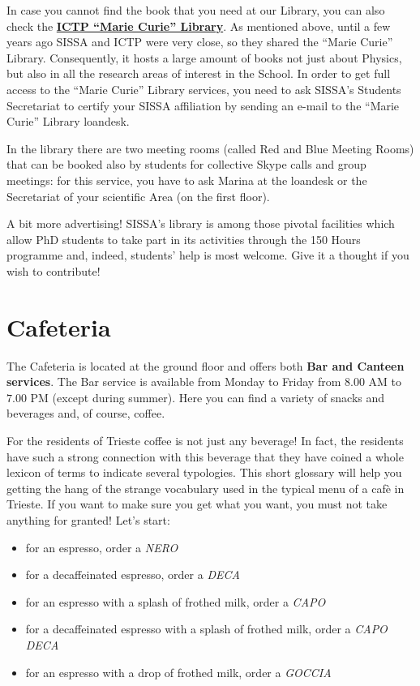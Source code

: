 \documentclass{sissavademecum}
\begin{document}
In case you cannot find the book that you need at our Library, you can also check the \href{http://library.ictp.it/}{\textbf{ICTP ``Marie Curie'' Library}}. As mentioned above, until a few years ago SISSA and ICTP were very close, so they shared the ``Marie Curie'' Library. Consequently, it hosts a large amount of books not just about Physics, but also in all the research areas of interest in the School. In order to get full access to the ``Marie Curie'' Library services, you need to ask SISSA's Students Secretariat to certify your SISSA affiliation by sending an e-mail to the ``Marie Curie'' Library loandesk.

In the library there are two meeting rooms (called Red and Blue Meeting Rooms) that can be booked also by students for collective Skype calls and group meetings: for this service, you have to ask Marina at the loandesk or the Secretariat of your scientific Area (on the first floor).

A bit more advertising! SISSA's library is among those pivotal facilities which allow PhD students to take part in its activities through the 150 Hours programme and, indeed, students' help is most welcome. Give it a thought if you wish to contribute!


\section{Cafeteria}

The Cafeteria is located at the ground floor and offers both \textbf{Bar and Canteen services}. The Bar service is available from Monday to Friday from $8.00$ AM to $7.00$ PM (except during summer). Here you can find a variety of snacks and beverages and, of course, coffee. 

For the residents of Trieste coffee is not just any beverage! In fact, the residents have such a strong connection with this beverage that they have coined a whole lexicon of terms to indicate several typologies. This short glossary will help you getting the hang of the strange vocabulary used in the typical menu of a caf\`e in Trieste. If you want to make sure you get what you want, you must not take anything for granted! Let's start:

\begin{itemize}
    \item for an espresso, order a \textit{NERO}
    \item for a decaffeinated espresso, order a \textit{DECA}
    \item for an espresso with a splash of frothed milk, order a \textit{CAPO}
    \item for a decaffeinated espresso with a splash of frothed milk, order a \textit{CAPO DECA}
    \item for an espresso with a drop of frothed milk, order a \textit{GOCCIA}
\end{itemize}
\end{document}
